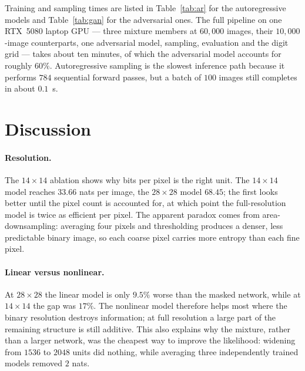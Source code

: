 \documentclass[11pt,a4paper]{article}
\begin{document}
Training and sampling times are listed in Table~\ref{tab:ar} for the autoregressive models and
Table~\ref{tab:gan} for the adversarial ones. The full pipeline on one RTX~5080 laptop GPU
--- three mixture members at $60{,}000$ images, their $10{,}000$-image counterparts, one
adversarial model, sampling, evaluation and the digit grid --- takes about ten minutes, of
which the adversarial model accounts for roughly $60\%$.
Autoregressive sampling is the slowest inference path because it performs $784$ sequential
forward passes, but a batch of $100$ images still completes in about $0.1$~s.

\section{Discussion}
\label{sec:discussion}

\paragraph{Resolution.}
The $14\times14$ ablation shows why bits per pixel is the right unit. The $14\times14$ model reaches $33.66$ nats per image, the $28\times28$ model
$68.45$; the first looks better until the pixel count is accounted for, at which point the
full-resolution model is twice as efficient per pixel. The apparent paradox comes from
area-downsampling: averaging four pixels and thresholding produces a denser, less predictable
binary image, so each coarse pixel carries more entropy than each fine pixel.

\paragraph{Linear versus nonlinear.}
At $28\times28$ the linear model is only $9.5\%$ worse than the masked network, while at
$14\times14$ the gap was $17\%$. The nonlinear model therefore helps most where the binary
resolution destroys information; at full resolution a large part of the remaining structure is
still additive. This also explains why the mixture, rather than a larger network, was the
cheapest way to improve the likelihood: widening from $1536$ to $2048$ units did nothing,
while averaging three independently trained models removed $2$ nats.
\end{document}
